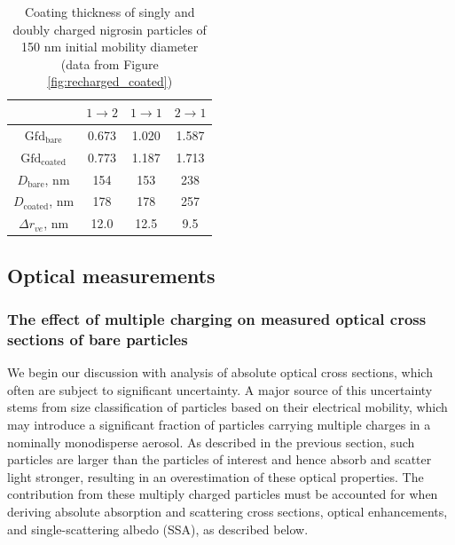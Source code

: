 \documentclass[12pt,authoryear]{elsarticle}
\begin{document}
\begin{table}[htp]
    \centering
    \caption{Coating thickness of singly and doubly charged nigrosin particles of 150 nm initial mobility diameter (data from Figure \ref{fig:recharged_coated})}
    \begin{tabular}{c c c c}
        \hline
        & $1\rightarrow 2$ & $1\rightarrow 1$ & $2\rightarrow 1$ \\
        \hline
        $\mathrm{Gfd}_\mathrm{bare}$ & 0.673 & 1.020 & 1.587\\
        $\mathrm{Gfd}_\mathrm{coated}$ & 0.773 & 1.187 & 1.713\\
        $D_{\mathrm{bare}}$, nm & 154 & 153 & 238 \\
        $D_{\mathrm{coated}}$, nm & 178 & 178 & 257 \\
        $\Delta r_{ve}$, nm & 12.0 & 12.5 & 9.5 \\
        \hline
    \end{tabular}
    \label{tab:recharged_coated}
\end{table}

\subsection{Optical measurements}

\label{sec:optical}

\subsubsection{The effect of multiple charging on measured optical cross sections of bare particles}

We begin our discussion with analysis of absolute optical cross sections, which often are subject to significant uncertainty. A major source of this uncertainty stems from size classification of particles based on their electrical mobility, which may introduce a significant fraction of particles carrying multiple charges in a nominally monodisperse aerosol. As described in the previous section, such particles are larger than the particles of interest and hence absorb and scatter light stronger, resulting in an overestimation of these optical properties. The contribution from these multiply charged particles must be accounted for when deriving absolute absorption and scattering cross sections, optical enhancements, and single-scattering albedo (SSA), as described below.
\end{document}
